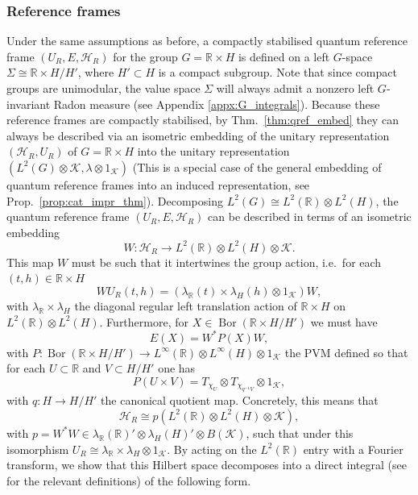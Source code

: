 \documentclass[sn-mathphys-num]{sn-jnl}%
\newcommand{\RR}{\mathbb{R}}
\newcommand{\HH}{\mathcal{H}}
\newcommand{\KK}{\mathcal{K}}
\DeclareMathOperator{\Bor}{Bor}
\numberwithin{equation}{section}
\theoremstyle{thmstyleone}%
\theoremstyle{thmstyletwo}%
\theoremstyle{thmstylethree}%
\begin{document}
\subsubsection{Reference frames}
\label{sec:RHQRF}
Under the same assumptions as before, a compactly stabilised quantum reference frame $( U_{R} , E ,\HH_{R} )$ for the group $G=\RR\times H$ is defined on a left $G$-space $\Sigma\cong \RR\times H/H'$, where $H'\subset H$ is a compact subgroup. Note that since compact groups are unimodular, the value space $\Sigma$ will always admit a nonzero left $G$-invariant Radon measure (see Appendix \ref{appx:G_integrals}). Because these reference frames are compactly stabilised, by Thm.\ \ref{thm:qref_embed} they can always be described via an isometric embedding of the unitary representation $( \mathcal{H}_{R} , U_{R} )$ of $G=\RR\times H$ into the unitary representation $(L^2(G)\otimes \KK,\lambda\otimes 1_\KK)$ (This is a special case of the general embedding of quantum reference frames into an induced representation, see Prop.\ \ref{prop:cat_impr_thm}). Decomposing $L^2(G)\cong L^2(\RR)\otimes L^2(H)$, the quantum reference frame $( U_{R} , E ,\HH_{R} )$ can be described in terms of an isometric embedding 
\begin{equation}
    W:\HH_R\to L^2(\RR)\otimes L^2(H)\otimes \KK.
\end{equation}
This map $W$ must be such that it intertwines the group action, i.e.\ for each $(t,h)\in \RR\times H$ 
\begin{equation}
    W U_R(t,h)=(\lambda_\RR(t)\times \lambda_{H}(h)\otimes 1_\KK)W,
\end{equation}
with $\lambda_\RR\times\lambda_{H}$ the diagonal regular left translation action of $\RR\times H$ on $L^2(\RR)\otimes L^2(H)$. Furthermore, for $X\in \Bor(\RR\times H/H')$ we must have
\begin{equation}
    E(X)=W^*P(X)W,
\end{equation}
with $P:\Bor(\RR\times H/H')\to L^\infty(\RR)\otimes L^\infty (H)\otimes 1_\KK$ the PVM defined so that for each $U\subset \RR$ and $V\subset H/H'$ one has
\begin{equation}
    P(U\times V)=T_{\chi_U}\otimes T_{\chi_{q^{-1}V}}\otimes 1_\KK,
\end{equation}
with $q:H\to H/H'$ the canonical quotient map. 
Concretely, this means that 
\begin{equation}
    \HH_R\cong p (L^2(\RR)\otimes L^2(H)\otimes \KK),
\end{equation}
with $p=W^*W\in \lambda_\RR(\RR)'\otimes \lambda_{H}(H)'\otimes B(\KK)$, such that under this isomorphism $U_R\cong \lambda_\RR\times \lambda_H\otimes 1_\KK$. By acting on the $L^2(\RR)$ entry with a Fourier transform, we show that this Hilbert space decomposes into a direct integral (see \cite[Ch.\ IV.8]{Takesaki2001} for the relevant definitions) of the following form.
\end{document}
